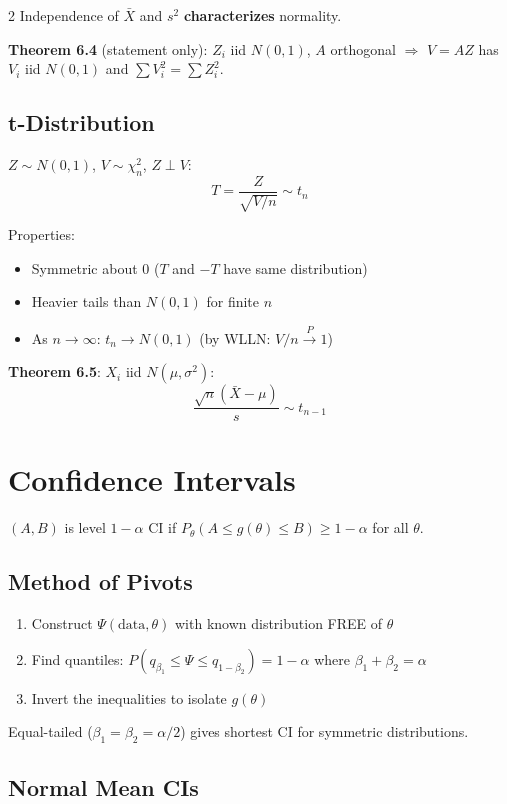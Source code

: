 \documentclass[8pt]{extarticle}
\begin{document}
\begin{multicols}{2}
Independence of $\bar X$ and $s^2$ \textbf{characterizes} normality.

\textbf{Theorem 6.4} (statement only): $Z_i$ iid $N(0,1)$, $A$ orthogonal $\Rightarrow$ $V=AZ$ has $V_i$ iid $N(0,1)$ and $\sum V_i^2 = \sum Z_i^2$.

\subsection{t-Distribution}

$Z \sim N(0,1)$, $V \sim \chi^2_n$, $Z \perp V$:
$$T = \frac{Z}{\sqrt{V/n}} \sim t_n$$

Properties:
\begin{itemize}
\item Symmetric about 0 ($T$ and $-T$ have same distribution)
\item Heavier tails than $N(0,1)$ for finite $n$
\item As $n\to\infty$: $t_n \to N(0,1)$ (by WLLN: $V/n \xrightarrow{P} 1$)
\end{itemize}

\textbf{Theorem 6.5}: $X_i$ iid $N(\mu,\sigma^2)$:
$$\frac{\sqrt{n}(\bar X - \mu)}{s} \sim t_{n-1}$$

\section{Confidence Intervals}

$(A,B)$ is level $1{-}\alpha$ CI if $P_\theta(A \le g(\theta) \le B) \ge 1{-}\alpha$ for all $\theta$.

\subsection{Method of Pivots}

\begin{enumerate}
\item Construct $\Psi(\text{data}, \theta)$ with known distribution FREE of $\theta$
\item Find quantiles: $P(q_{\beta_1} \le \Psi \le q_{1-\beta_2}) = 1{-}\alpha$ where $\beta_1+\beta_2=\alpha$
\item Invert the inequalities to isolate $g(\theta)$
\end{enumerate}

Equal-tailed ($\beta_1{=}\beta_2{=}\alpha/2$) gives shortest CI for symmetric distributions.

\subsection{Normal Mean CIs}


\end{multicols}
\end{document}
